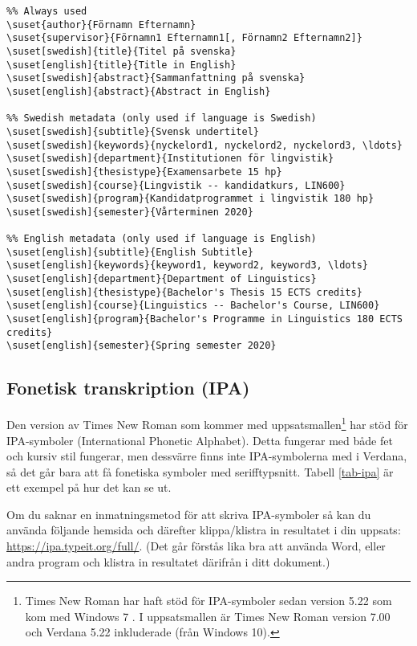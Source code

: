 \begin{verbatim}
%% Always used
\suset{author}{Förnamn Efternamn}
\suset{supervisor}{Förnamn1 Efternamn1[, Förnamn2 Efternamn2]}
\suset[swedish]{title}{Titel på svenska}
\suset[english]{title}{Title in English}
\suset[swedish]{abstract}{Sammanfattning på svenska}
\suset[english]{abstract}{Abstract in English}

%% Swedish metadata (only used if language is Swedish)
\suset[swedish]{subtitle}{Svensk undertitel}
\suset[swedish]{keywords}{nyckelord1, nyckelord2, nyckelord3, \ldots}
\suset[swedish]{department}{Institutionen för lingvistik}
\suset[swedish]{thesistype}{Examensarbete 15 hp}
\suset[swedish]{course}{Lingvistik -- kandidatkurs, LIN600}
\suset[swedish]{program}{Kandidatprogrammet i lingvistik 180 hp}
\suset[swedish]{semester}{Vårterminen 2020}

%% English metadata (only used if language is English)
\suset[english]{subtitle}{English Subtitle}
\suset[english]{keywords}{keyword1, keyword2, keyword3, \ldots}
\suset[english]{department}{Department of Linguistics}
\suset[english]{thesistype}{Bachelor's Thesis 15 ECTS credits}
\suset[english]{course}{Linguistics -- Bachelor's Course, LIN600}
\suset[english]{program}{Bachelor's Programme in Linguistics 180 ECTS credits}
\suset[english]{semester}{Spring semester 2020}
\end{verbatim}


\subsection{Fonetisk transkription (IPA)}
\label{ipa}

Den version av Times New Roman som kommer med uppsatsmallen\footnote{Times New
  Roman har haft stöd för IPA-symboler sedan version 5.22 \citep{ipa} som kom
  med Windows 7 \citep{win-7-fonts}. I uppsatsmallen är Times New Roman version
  7.00 och Verdana 5.22 inkluderade (från Windows 10).} har stöd för
IPA-symboler (International Phonetic Alphabet). Detta fungerar med både fet och
kursiv stil fungerar, men dessvärre finns inte IPA-symbolerna med i Verdana, så
det går bara att få fonetiska symboler med serifftypsnitt. Tabell
\ref{tab-ipa} är ett exempel på hur det kan se ut.

Om du saknar en inmatningsmetod för att skriva IPA-symboler så kan du använda
följande hemsida och därefter klippa/klistra in resultatet i din uppsats:
\url{https://ipa.typeit.org/full/}. (Det går förstås lika bra att använda Word,
eller andra program och klistra in resultatet därifrån i ditt dokument.)

